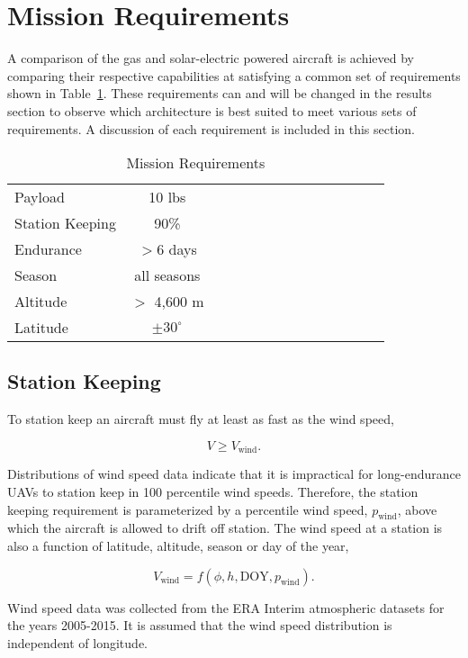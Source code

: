 \section{Mission Requirements}

A comparison of the gas and solar-electric powered aircraft is achieved by comparing their respective capabilities at satisfying a common set of requirements shown in Table~\ref{t:mreqs}.  These requirements can and will be changed in the results section to observe which architecture is best suited to meet various sets of requirements. A discussion of each requirement is included in this section.  

\begin{longtable}{lccccccccccccc}
\caption{Mission Requirements}\\
\toprule
\toprule
\label{t:mreqs}
Payload & 10 lbs\\
Station Keeping & 90\% \\
Endurance & $>6$ days\\
Season & all seasons\\
Altitude & $>$ 4,600 m\\
Latitude & $\pm30^{\circ}$\\
\bottomrule
\end{longtable}

\subsection{Station Keeping}

To station keep an aircraft must fly at least as fast as the wind speed,

\begin{equation}
    \label{e:availreq}
    V \geq V_{\text{wind}}.
\end{equation}

Distributions of wind speed data\cite{wind} indicate that it is impractical for long-endurance UAVs to station keep in 100 percentile wind speeds.  
Therefore, the station keeping requirement is parameterized by a percentile wind speed, $p_{\text{wind}}$, above which the aircraft is allowed to drift off station. 
The wind speed at a station is also a function of latitude, altitude, season or day of the year,

\begin{equation}
    \label{e:windspeed}
    V_{\text{wind}} = f(\phi, h, \text{DOY}, p_{\text{wind}}).
    \end{equation}

Wind speed data was collected from the ERA Interim atmospheric datasets for the years 2005-2015.\cite{wind} 
It is assumed that the wind speed distribution is independent of longitude. 

